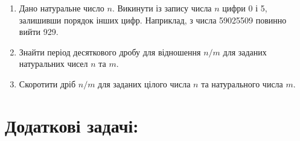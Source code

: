\documentclass[a5paper,titlepage,openany,twoside,draft]{book_unv}%
\makeatletter
\newcommand{\xslalph}[1]{\expandafter\@xslalph\csname c@#1\endcsname}
\newcommand{\@xslalph}[1]{%
    \ifcase#1\or а\or б\or в\or г\or д\or e\or є\or ж\or з\or i%
    \or й\or к\or л\or м\or н\or о\or п\or р\or с\or т%
    \or у\or ф\or х\or ц\or ч\or ш\or ю\or я\or аа\or бб\or вв%
    \else\@ctrerr\fi%
}
\makeatother
\begin{document}
\begin{enumerate}
\begin{enumerate}[label=\xslalph*)]

\item \(\max(\left| z_{1} \right|,\ldots,\left| z_{n} \right|),\) де
\(z_{i} = \left\{ \begin{matrix}
y_{i},\textup{ при }\left| y_{i} \right| \leq 2, \\
0.5,\textup{у інших випадках} \\
\end{matrix} \right.\ \);
\item \(\min(\left| z_{1} \right|,\ldots,\left| z_{n} \right|),\) де
\(z_{i} = \left\{ \begin{matrix}
 y_{i},\textup{при}\left| y_{i} \right| \geq 1, \\
 2,\textup{у інших випадках} \\
\end{matrix} \right.\ \);
\item \(z_{1} + z_{2} + \ldots + z_{n},\) де
\(z_{i} = \left\{ \begin{matrix}
 y_{i},\textup{при} {y}_{i} < 10, \\
 1,\textup{у інших випадках} \\
\end{matrix} \right.\ \)
 \end{enumerate}

\item
  Дано натуральне число $n$. Викинути із запису числа $n$ цифри 0 і 5,
  залишивши порядок інших цифр. Наприклад, з числа 59025509 повинно
  вийти 929.
\item
  Знайти період десяткового дробу для відношення $n/m$ для заданих
  натуральних чисел $n$ та $m$.
\item
  Скоротити дріб $n/m$ для заданих цілого числа $n$ та натурального числа $m$.
\end{enumerate}

 \section{Додаткові задачі:}
\end{document}
